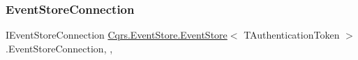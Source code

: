\subsubsection{\texorpdfstring{Event\+Store\+Connection}{EventStoreConnection}}
{\footnotesize\ttfamily I\+Event\+Store\+Connection \hyperlink{classCqrs_1_1EventStore_1_1EventStore}{Cqrs.\+Event\+Store.\+Event\+Store}$<$ T\+Authentication\+Token $>$.Event\+Store\+Connection\hspace{0.3cm}{\ttfamily [get]}, {\ttfamily [set]}, {\ttfamily [protected]}}

